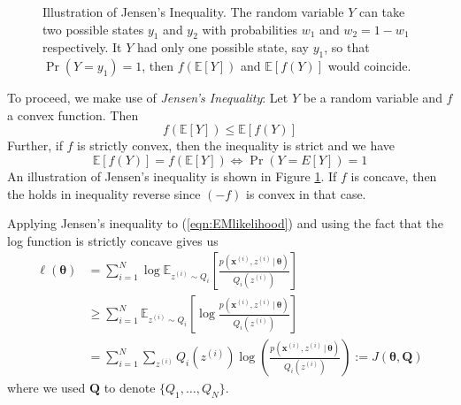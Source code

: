 \documentclass[final,3p,times,twocolumn]{elsarticle}
\let\bs\boldsymbol
\begin{document}
\begin{figure}
\caption{Illustration of Jensen's Inequality.
The random variable $Y$ can take two possible states $y_1$ and $y_2$ with probabilities $w_1$ and $w_2=1-w_1$ respectively.
It $Y$ had only one possible state, say $y_1$, so that $\Pr(Y=y_1)=1$, then $f\left(\mathbb{E}[Y]\right)$ and $\mathbb{E}\left[f(Y)\right]$ would coincide.
}
\label{fig:jensen}
\end{figure}

To proceed, we make use of \emph{Jensen's Inequality}:
Let $Y$ be a random variable and $f$ a convex function. Then
\begin{equation}
f\left(\mathbb{E}[Y]\right) \leq \mathbb{E}\left[f(Y)\right]
\label{eqn:jensen}
\end{equation}
Further, if $f$ is strictly convex, then the inequality is strict and we have
\begin{equation}
\mathbb{E}\left[f(Y)\right] = f\left(\mathbb{E}[Y]\right) \iff \Pr\left(Y = E[Y]\right) = 1
\label{eqn:jensentight}
\end{equation}
An illustration of Jensen's inequality is shown in Figure \ref{fig:jensen}.
If $f$ is concave, then the holds in inequality reverse since $(-f)$ is convex in that case. 

Applying Jensen's inequality to (\ref{eqn:EMlikelihood}) and using the fact that the log function is strictly concave gives us
\begin{equation}
\begin{split}
\ell(\bs\theta) &=  \sum_{i=1}^N \log \mathbb{E}_{z^{(i)} \sim Q_i}\left[\frac{p(\bs x^{(i)},z^{(i)}\,|\,\bs\theta)}{Q_i(z^{(i)})}\right]\\
&\geq \sum_{i=1}^N \mathbb{E}_{z^{(i)} \sim Q_i}\left[\log \frac{p(\bs x^{(i)},z^{(i)}\,|\,\bs\theta)}{Q_i(z^{(i)})}\right]\\ 
&= \sum_{i=1}^N \sum_{z^{(i)}} Q_i(z^{(i)}) \log \left(\frac{p(\bs x^{(i)},z^{(i)}\,|\,\bs\theta)}{Q_i(z^{(i)})}\right) := J(\bs\theta,\bs Q)
\end{split}
\end{equation}
where we used $\bs Q$ to denote $\{Q_1,\dots,Q_N\}$.
\end{document}
